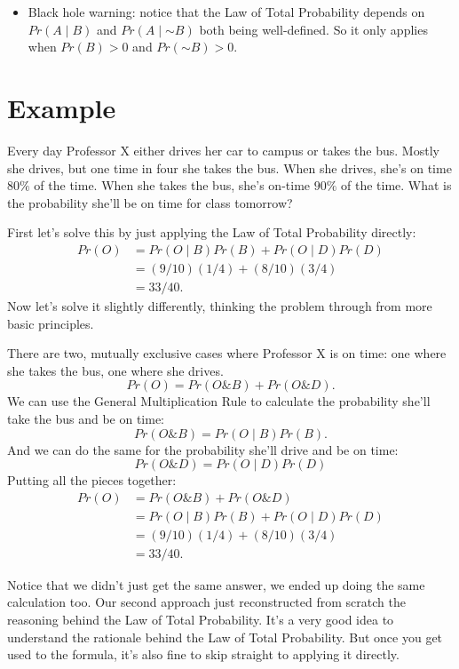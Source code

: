 \documentclass[justified]{tufte-book}
\newcommand{\given}{\mid}
\renewcommand{\neg}{\mathbin{\sim}}
\renewcommand{\wedge}{\mathbin{\&}}
\newcommand{\gt}{>}
\newcommand{\p}{Pr}
\newenvironment{warning}{\begin{itemize}\item[\faBan]}{\end{itemize}}
\theoremstyle{definition}
\theoremstyle{definition}
\theoremstyle{definition}
\theoremstyle{definition}
\theoremstyle{remark}
\begin{document}
\begin{warning}
Black hole warning: notice that the Law of Total Probability depends on
\(\p(A \given B)\) and \(\p(A \given \neg B)\) both being well-defined.
So it only applies when \(\p(B) \gt 0\) and \(\p(\neg B) \gt 0\).
\end{warning}

\hypertarget{example}{%
\section{Example}\label{example}}

Every day Professor X either drives her car to campus or takes the bus. Mostly she drives, but one time in four she takes the bus. When she drives, she's on time \(80\%\) of the time. When she takes the bus, she's on-time \(90\%\) of the time. What is the probability she'll be on time for class tomorrow?

First let's solve this by just applying the Law of Total Probability directly:
\[
  \begin{aligned}
    \p(O) &= \p(O \given B)\p(B) + \p(O \given D)\p(D)\\
          &= (9/10)(1/4) + (8/10)(3/4)\\
          &= 33/40.
  \end{aligned}
\]
Now let's solve it slightly differently, thinking the problem through from more basic principles.

There are two, mutually exclusive cases where Professor X is on time: one where she takes the bus, one where she drives.
\[ \p(O) = \p(O \wedge B) + \p(O \wedge D). \]
We can use the General Multiplication Rule to calculate the probability she'll take the bus and be on time:
\[ \p(O \wedge B) = \p(O \given B)\p(B). \]
And we can do the same for the probability she'll drive and be on time:
\[ \p(O \wedge D) = \p(O \given D)\p(D)\]
Putting all the pieces together:
\[
  \begin{aligned}
    \p(O) &= \p(O \wedge B) + \p(O \wedge D)\\
          &= \p(O \given B)\p(B) + \p(O \given D)\p(D)\\
          &= (9/10)(1/4) + (8/10)(3/4)\\
          &= 33/40.
  \end{aligned}
\]

Notice that we didn't just get the same answer, we ended up doing the same calculation too. Our second approach just reconstructed from scratch the reasoning behind the Law of Total Probability. It's a very good idea to understand the rationale behind the Law of Total Probability. But once you get used to the formula, it's also fine to skip straight to applying it directly.
\end{document}
